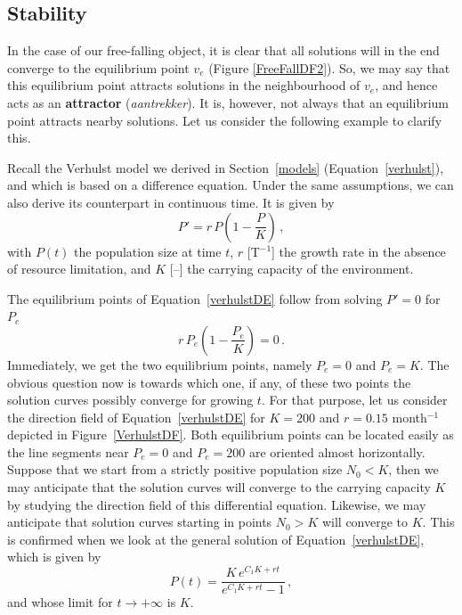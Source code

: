 \subsection{Stability}
\label{1stOrderStability}

In the case of our free-falling object, it is clear that all solutions will in the end converge to the equilibrium point $v_e$ (Figure \ref{FreeFallDF2}). So, we may say that this equilibrium point attracts solutions in the neighbourhood of $v_e$, and hence acts as an \textbf{attractor} (\textit{aantrekker}). It is, however, not always that an equilibrium point attracts nearby solutions. Let us consider the following example to clarify this. 

\newpage

\begin{example}
\label{verhulstex}
Recall the Verhulst model we derived in Section~\ref{models} (Equation~\eqref{verhulst}), and which is based on a difference equation. Under the same assumptions, we can also derive its counterpart in continuous time. It is given by
\begin{equation}
P'=r\,P\left(1-\dfrac{P}{K}\right)\,,
\label{verhulstDE}
\end{equation}
with $P(t)$ the population size at time $t$, $r$ [T$^{-1}$] the growth rate in the absence of resource limitation, and $K$ [--] the carrying capacity of the environment. 

The equilibrium points of Equation~\eqref{verhulstDE} follow from solving $P'=0$ for $P_e$
$$
r\,P_e\left(1-\dfrac{P_e}{K}\right)=0\,.
$$
Immediately, we get the two equilibrium points, namely $P_e=0$ and $P_e=K$. The obvious question now is towards which one, if any, of these two points the solution curves possibly converge for growing $t$. For that purpose, let us consider the direction field of Equation~\eqref{verhulstDE} for $K=200$ and $r=0.15$ month$^{-1}$ depicted in Figure~\ref{VerhulstDF}. Both equilibrium points can be located easily as the line segments near $P_e=0$ and $P_e=200$ are oriented almost horizontally. Suppose that we start from a strictly positive population size $N_0<K$, then we may anticipate that the solution curves will converge to the carrying capacity $K$ by studying the direction field of this differential equation. Likewise, we may anticipate that solution curves starting in points $N_0>K$ will converge to $K$. This is confirmed when we look at the general solution of Equation~\eqref{verhulstDE}, which is given by
$$
P(t)=\frac{K\,e^{C_1K+rt}}{e^{C_1K+rt}-1}\,,
$$
and whose limit for $t\to+\infty$ is $K$. 


\end{example}

